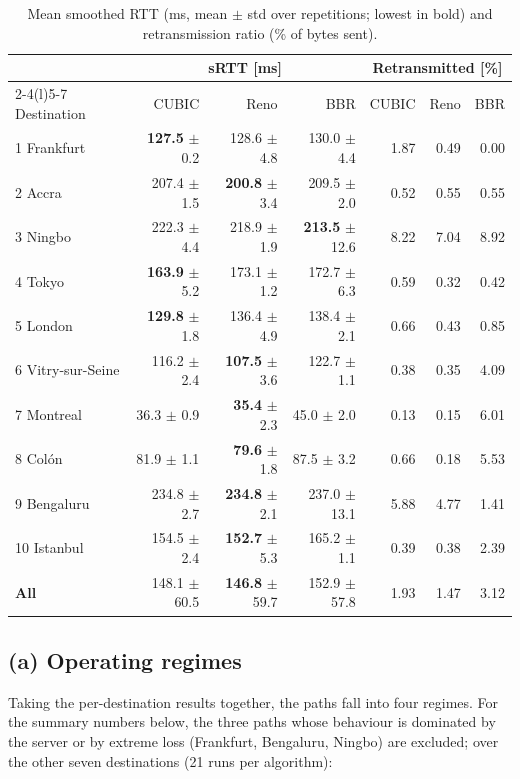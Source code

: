 \documentclass[10pt]{article}
\begin{document}
\begin{table}[htbp]
\centering\small
\caption{Mean smoothed RTT (ms, mean $\pm$ std over repetitions; lowest in bold) and retransmission ratio (\% of bytes sent).}
\label{tab:cmprtt}
\begin{tabular}{@{}lrrrrrr@{}}
\toprule
& \multicolumn{3}{c}{sRTT [ms]} & \multicolumn{3}{c}{Retransmitted [\%]} \\
\cmidrule(lr){2-4}\cmidrule(l){5-7}
Destination & CUBIC & Reno & BBR & CUBIC & Reno & BBR \\
\midrule
1 Frankfurt & \textbf{127.5} $\pm$ 0.2 & 128.6 $\pm$ 4.8 & 130.0 $\pm$ 4.4 & 1.87 & 0.49 & 0.00 \\
2 Accra & 207.4 $\pm$ 1.5 & \textbf{200.8} $\pm$ 3.4 & 209.5 $\pm$ 2.0 & 0.52 & 0.55 & 0.55 \\
3 Ningbo & 222.3 $\pm$ 4.4 & 218.9 $\pm$ 1.9 & \textbf{213.5} $\pm$ 12.6 & 8.22 & 7.04 & 8.92 \\
4 Tokyo & \textbf{163.9} $\pm$ 5.2 & 173.1 $\pm$ 1.2 & 172.7 $\pm$ 6.3 & 0.59 & 0.32 & 0.42 \\
5 London & \textbf{129.8} $\pm$ 1.8 & 136.4 $\pm$ 4.9 & 138.4 $\pm$ 2.1 & 0.66 & 0.43 & 0.85 \\
6 Vitry-sur-Seine & 116.2 $\pm$ 2.4 & \textbf{107.5} $\pm$ 3.6 & 122.7 $\pm$ 1.1 & 0.38 & 0.35 & 4.09 \\
7 Montreal & 36.3 $\pm$ 0.9 & \textbf{35.4} $\pm$ 2.3 & 45.0 $\pm$ 2.0 & 0.13 & 0.15 & 6.01 \\
8 Colón & 81.9 $\pm$ 1.1 & \textbf{79.6} $\pm$ 1.8 & 87.5 $\pm$ 3.2 & 0.66 & 0.18 & 5.53 \\
9 Bengaluru & 234.8 $\pm$ 2.7 & \textbf{234.8} $\pm$ 2.1 & 237.0 $\pm$ 13.1 & 5.88 & 4.77 & 1.41 \\
10 Istanbul & 154.5 $\pm$ 2.4 & \textbf{152.7} $\pm$ 5.3 & 165.2 $\pm$ 1.1 & 0.39 & 0.38 & 2.39 \\
\midrule
\textbf{All} & 148.1 $\pm$ 60.5 & \textbf{146.8} $\pm$ 59.7 & 152.9 $\pm$ 57.8 & 1.93 & 1.47 & 3.12 \\
\bottomrule
\end{tabular}
\end{table}

\subsection{(a) Operating regimes}

Taking the per-destination results together, the paths fall into four regimes. For the summary numbers below, the three paths whose behaviour is dominated by the server or by extreme loss (Frankfurt, Bengaluru, Ningbo) are excluded; over the other seven destinations (21 runs per algorithm):
\end{document}
